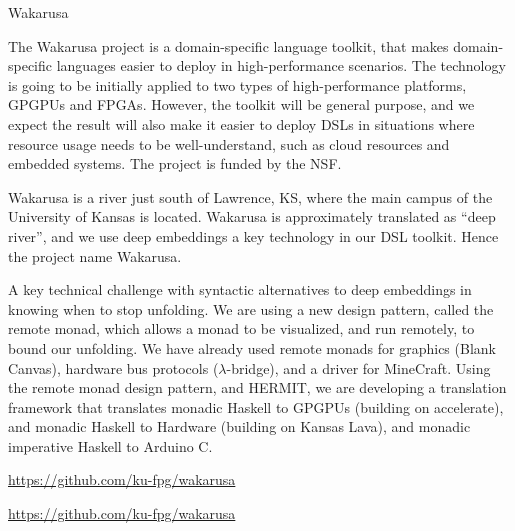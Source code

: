 \begin{hcarentry}{Wakarusa}
\label{Wakarusa}
\makeheader

The Wakarusa project is a domain-specific language toolkit,
that makes domain-specific languages easier to deploy in
high-performance scenarios. The technology is going to be initially
applied to two types of high-performance platforms, GPGPUs and
FPGAs. However, the toolkit will be general purpose, and we expect the
result will also make it easier to deploy DSLs in situations where
resource usage needs to be well-understand, such as cloud resources
and embedded systems. The project is funded by the NSF.

Wakarusa is a river just south of Lawrence, KS, where the main campus
of the University of Kansas is located. Wakarusa is approximately
translated as ``deep river'', and we use deep embeddings a key
technology in our DSL toolkit. Hence the project name Wakarusa.

A key technical challenge with syntactic alternatives to deep embeddings
in knowing when to stop unfolding. We are using a new design pattern,
called the remote monad, which allows a monad to be visualized, and
run remotely, to bound our unfolding. 
%
We have already used remote monads for graphics (Blank Canvas),
hardware bus protocols ($\lambda$-bridge), and a driver for MineCraft.
Using the remote monad design pattern, and HERMIT, we are developing
a translation framework that translates monadic Haskell to GPGPUs (building on
accelerate), and monadic Haskell to Hardware (building on Kansas Lava),
and monadic imperative Haskell to Arduino C.

\FurtherReading
\begin{compactitem}
\item
  \url{https://github.com/ku-fpg/wakarusa}
\item
  \url{https://github.com/ku-fpg/wakarusa}
\end{compactitem}
\end{hcarentry}
